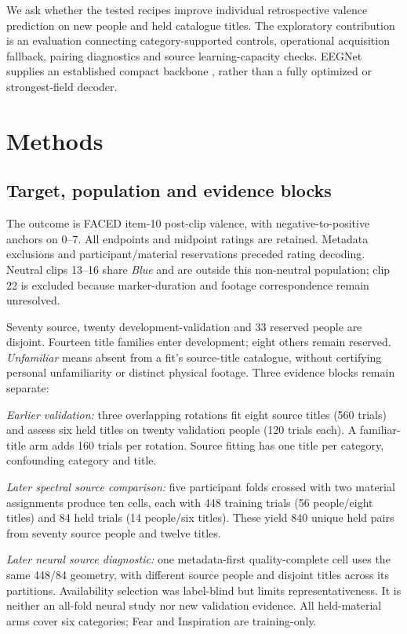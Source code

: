 \documentclass[11pt,a4paper]{article}
\begin{document}
We ask whether the tested recipes improve individual retrospective valence prediction on new people and held catalogue titles. The exploratory contribution is an evaluation connecting category-supported controls, operational acquisition fallback, pairing diagnostics and source learning-capacity checks. EEGNet supplies an established compact backbone \cite{lawhern2018eegnet}, rather than a fully optimized or strongest-field decoder.

\section{Methods}
\subsection{Target, population and evidence blocks}
The outcome is FACED item-10 post-clip valence, with negative-to-positive anchors on 0--7. All endpoints and midpoint ratings are retained. Metadata exclusions and participant/material reservations preceded rating decoding. Neutral clips 13--16 share \emph{Blue} and are outside this non-neutral population; clip 22 is excluded because marker-duration and footage correspondence remain unresolved.

Seventy source, twenty development-validation and 33 reserved people are disjoint. Fourteen title families enter development; eight others remain reserved. \emph{Unfamiliar} means absent from a fit's source-title catalogue, without certifying personal unfamiliarity or distinct physical footage. Three evidence blocks remain separate:

\textit{Earlier validation:} three overlapping rotations fit eight source titles (560 trials) and assess six held titles on twenty validation people (120 trials each). A familiar-title arm adds 160 trials per rotation. Source fitting has one title per category, confounding category and title.

\textit{Later spectral source comparison:} five participant folds crossed with two material assignments produce ten cells, each with 448 training trials (56 people/eight titles) and 84 held trials (14 people/six titles). These yield 840 unique held pairs from seventy source people and twelve titles.

\textit{Later neural source diagnostic:} one metadata-first quality-complete cell uses the same 448/84 geometry, with different source people and disjoint titles across its partitions. Availability selection was label-blind but limits representativeness. It is neither an all-fold neural study nor new validation evidence. All held-material arms cover six categories; Fear and Inspiration are training-only.
\end{document}
